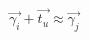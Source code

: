 \documentclass[preview,convert={outext=.png,density=1600}]{standalone}
\begin{document}
$\vec{\gamma_i} + \vec{t_u} \approx \vec{\gamma_j}$
\end{document}
